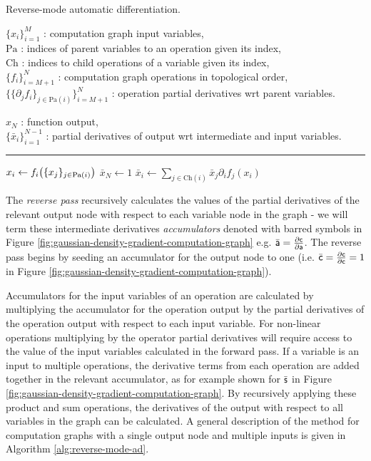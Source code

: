 \begin{algorithm}[!t]
\caption{Reverse-mode automatic differentiation.}
\label{alg:reverse-mode-ad}
\begin{algorithmic}
\small
    \Require
    $\lbrace x_i \rbrace_{i=1}^M$ : computation graph input variables,\\
    $\textrm{Pa}$ : indices of parent variables to an operation given its index,\\
    $\textrm{Ch}$ : indices to child operations of a variable given its index,\\
    $\lbrace f_i \rbrace_{i=M+1}^N$ : computation graph operations in topological order,\\%
    $\lbrace \lbrace \partial_j f_i\rbrace_{j \in \textrm{Pa}(i)}\rbrace_{i=M+1}^N$ : operation partial derivatives \acs{wrt} parent variables.
    \Ensure\raggedright
    $x_{N}$ : function output,\\
    $\lbrace \bar{x}_i \rbrace_{i=1}^{N-1}$ : partial derivatives of output \acs{wrt} intermediate and input variables.
\end{algorithmic}
\hrule
\small
\begin{algorithmic}[1]
    \State $x_i \gets f_i\lpa \lbrace x_j \rbrace_{j \in \textrm{Pa}(i)}\rpa$
  \EndFor
  \State $\bar{x}_N \gets 1$
    \State $\bar{x}_i \gets \sum_{j \in \textrm{Ch}(i)} \bar{x}_j \partial_i{f_j}(x_i)$
  \EndFor
\end{algorithmic}
\end{algorithm}

The \emph{reverse pass} recursively calculates the values of the partial derivatives of the relevant output node with respect to each variable node in the graph - we will term these intermediate derivatives \emph{accumulators} denoted with barred symbols in Figure \ref{fig:gaussian-density-gradient-computation-graph} e.g. $\bar{\mathsf{a}} = \frac{\partial \mathsf{c}}{\partial \mathsf{a}}$. The reverse pass begins by seeding an accumulator for the output node to one (i.e. $\bar{\mathsf{c}} = \frac{\partial \mathsf{c}}{\partial \mathsf{c}} = 1$ in Figure \ref{fig:gaussian-density-gradient-computation-graph}). 

Accumulators for the input variables of an operation are calculated by multiplying the accumulator for the operation output by the partial derivatives of the operation output with respect to each input variable. For non-linear operations multiplying by the operator partial derivatives will require access to the value of the input variables calculated in the forward pass. If a variable is an input to multiple operations, the derivative terms from each operation are added together in the relevant accumulator, as for example shown for $\bar{\mathsf{s}}$ in Figure \ref{fig:gaussian-density-gradient-computation-graph}. By recursively applying these product and sum operations, the derivatives of the output with respect to all variables in the graph can be calculated. A general description of the method for computation graphs with a single output node and multiple inputs is given in Algorithm \ref{alg:reverse-mode-ad}.

